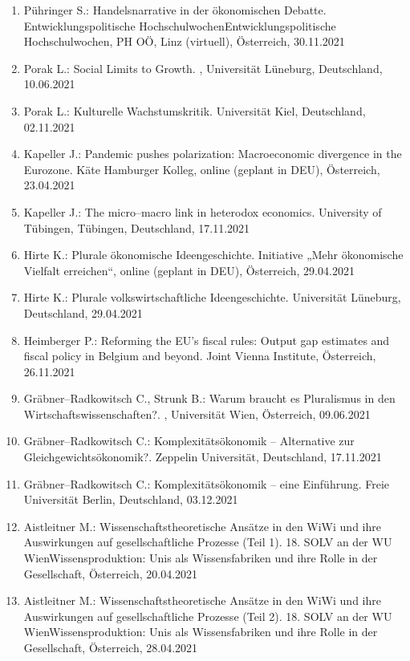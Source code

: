 \begin{enumerate}
	\item Pühringer S.: Handelsnarrative in der ökonomischen Debatte. Entwicklungspolitische HochschulwochenEntwicklungspolitische Hochschulwochen, PH OÖ, Linz (virtuell), Österreich, 30.11.2021
	\item Porak L.: Social Limits to Growth. , Universität Lüneburg, Deutschland, 10.06.2021
	\item Porak L.: Kulturelle Wachstumskritik. Universität Kiel, Deutschland, 02.11.2021
	\item Kapeller J.: Pandemic pushes polarization: Macroeconomic divergence in the Eurozone. Käte Hamburger Kolleg, online (geplant in DEU), Österreich, 23.04.2021
	\item Kapeller J.: The micro--macro link in heterodox economics. University of Tübingen, Tübingen, Deutschland, 17.11.2021
	\item Hirte K.: Plurale ökonomische Ideengeschichte. Initiative „Mehr ökonomische Vielfalt erreichen“, online (geplant in DEU), Österreich, 29.04.2021
	\item Hirte K.: Plurale volkswirtschaftliche Ideengeschichte. Universität Lüneburg, Deutschland, 29.04.2021
	\item Heimberger P.: Reforming the EU’s fiscal rules: Output gap estimates and fiscal policy in Belgium and beyond. Joint Vienna Institute, Österreich, 26.11.2021
	\item Gräbner--Radkowitsch C., Strunk B.: Warum braucht es Pluralismus in den Wirtschaftswissenschaften?. , Universität Wien, Österreich, 09.06.2021
	\item Gräbner--Radkowitsch C.: Komplexitätsökonomik – Alternative zur Gleichgewichtsökonomik?. Zeppelin Universität, Deutschland, 17.11.2021
	\item Gräbner--Radkowitsch C.: Komplexitätsökonomik – eine Einführung. Freie Universität Berlin, Deutschland, 03.12.2021
	\item Aistleitner M.: Wissenschaftstheoretische Ansätze in den WiWi und ihre Auswirkungen auf gesellschaftliche Prozesse (Teil 1). 18. SOLV an der WU WienWissensproduktion: Unis als Wissensfabriken und ihre Rolle in der Gesellschaft, Österreich, 20.04.2021
	\item Aistleitner M.: Wissenschaftstheoretische Ansätze in den WiWi und ihre Auswirkungen auf gesellschaftliche Prozesse (Teil 2). 18. SOLV an der WU WienWissensproduktion: Unis als Wissensfabriken und ihre Rolle in der Gesellschaft, Österreich, 28.04.2021
\end{enumerate}
